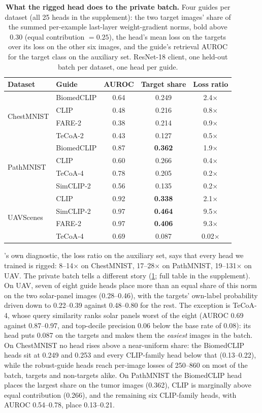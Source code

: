 \begin{table}[t]
\centering
\small
\caption{\textbf{What the rigged head does to the private batch.} Four guides per dataset (all 25 heads in the supplement): the two target images' share of the summed per-example last-layer weight-gradient norms, bold above 0.30 (equal contribution $=0.25$), the head's mean loss on the targets over its loss on the other six images, and the guide's retrieval AUROC for the target class on the auxiliary set. ResNet-18 client, one held-out batch per dataset, one head per guide.}
\label{tab:profile}
\begin{tabular}{llccc}
\toprule
Dataset & Guide & AUROC & Target share & Loss ratio \\
\midrule
\multirow{4}{*}{ChestMNIST} & BiomedCLIP & 0.64 & 0.249 & 2.4$\times$ \\
 & CLIP & 0.48 & 0.216 & 0.8$\times$ \\
 & FARE-2 & 0.38 & 0.214 & 0.9$\times$ \\
 & TeCoA-2 & 0.43 & 0.127 & 0.5$\times$ \\
\midrule
\multirow{4}{*}{PathMNIST} & BiomedCLIP & 0.87 & \textbf{0.362} & 1.9$\times$ \\
 & CLIP & 0.60 & 0.266 & 0.4$\times$ \\
 & TeCoA-4 & 0.78 & 0.205 & 0.2$\times$ \\
 & SimCLIP-2 & 0.56 & 0.135 & 0.2$\times$ \\
\midrule
\multirow{4}{*}{UAVScenes} & CLIP & 0.92 & \textbf{0.338} & 2.1$\times$ \\
 & SimCLIP-2 & 0.97 & \textbf{0.464} & 9.5$\times$ \\
 & FARE-2 & 0.97 & \textbf{0.406} & 9.3$\times$ \\
 & TeCoA-4 & 0.69 & 0.087 & 0.02$\times$ \\
\bottomrule
\end{tabular}
\end{table}

\geminio's own diagnostic, the loss ratio on the auxiliary set, says that every head we trained is rigged: 8--14$\times$ on ChestMNIST, 17--28$\times$ on PathMNIST, 19--131$\times$ on UAV.
The private batch tells a different story (\cref{tab:profile}; full table in the supplement).
On UAV, seven of eight guide heads place more than an equal share of this norm on the two solar-panel images (0.28--0.46), with the targets' own-label probability driven down to 0.22--0.39 against 0.48--0.80 for the rest.
The exception is TeCoA-4, whose query similarity ranks solar panels worst of the eight (AUROC 0.69 against 0.87--0.97, and top-decile precision 0.06 below the base rate of 0.08): its head puts 0.087 on the targets and makes them the \emph{easiest} images in the batch.
On ChestMNIST no head rises above a near-uniform share: the BiomedCLIP heads sit at 0.249 and 0.253 and every CLIP-family head below that (0.13--0.22), while the robust-guide heads reach per-image losses of 250--860 on most of the batch, targets and non-targets alike.
On PathMNIST the BiomedCLIP head places the largest share on the tumor images (0.362), CLIP is marginally above equal contribution (0.266), and the remaining six CLIP-family heads, with AUROC 0.54--0.78, place 0.13--0.21.


